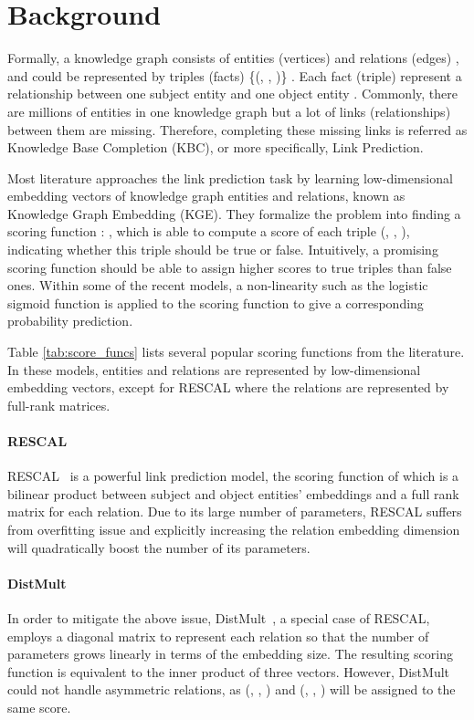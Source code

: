 \documentclass[letterpaper]{article} \usepackage{aaai20}  \usepackage{times}  \usepackage{helvet} \usepackage{courier}  \usepackage{booktabs}
\begin{document}
\section{Background}
Formally, a knowledge graph   consists of entities (vertices)  and relations (edges) , and could be represented by triples (facts) \{(, , )\}  . Each fact (triple) represent a relationship   between one subject entity  and  one object entity . Commonly, there are millions of entities in one knowledge graph but a lot of links (relationships) between them are missing. Therefore, completing these missing links is referred as Knowledge Base Completion (KBC), or more specifically, Link Prediction. 

Most literature approaches the link prediction task by learning low-dimensional embedding vectors of knowledge graph entities and relations, known as Knowledge Graph Embedding (KGE). They formalize the problem into finding a scoring function  : , which is able to compute a score of each triple (, , ), indicating whether this triple should be true or false. Intuitively, a promising scoring function should be able to assign higher scores to true triples than false ones. Within some of the recent models, a non-linearity such as the logistic sigmoid function is applied to the scoring function to give a corresponding probability prediction. 

Table \ref{tab:score_funcs} lists several popular scoring functions  from the literature. In these models,  entities and relations are represented by low-dimensional embedding vectors, except for RESCAL where the relations are represented by full-rank matrices. 

\paragraph{RESCAL} RESCAL~\cite{nickel2011three} is a powerful link prediction model, the scoring function of which is a bilinear product between subject and object entities' embeddings and a full rank matrix for each relation. Due to its large number of parameters, RESCAL suffers from overfitting issue and explicitly increasing the relation embedding dimension will quadratically boost the number of its parameters. 

\paragraph{DistMult} 
In order to mitigate the above issue, DistMult~\cite{yang2014embedding}, a special case of RESCAL, employs a diagonal matrix to represent each relation so that the number of parameters grows linearly in terms of the embedding size. The resulting scoring function is equivalent to the inner product of three vectors. However, DistMult could not handle asymmetric relations, as (, , ) and (, , ) will be assigned to the same score.
\end{document}
